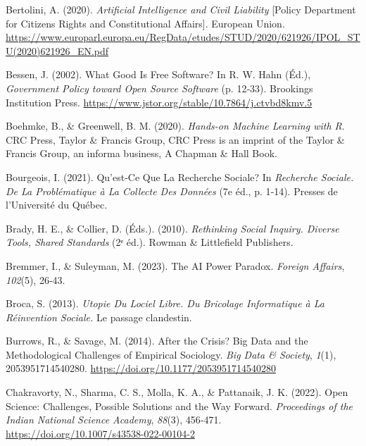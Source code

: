 \documentclass[
  letterpaper,
  DIV=11,
  numbers=noendperiod,
  oneside]{scrreprt}
\newlength{\cslhangindent}
\newlength{\cslentryspacingunit} %
\newenvironment{CSLReferences}[2] %
 {%
  \setlength{\parindent}{0pt}
  \ifodd #1
  \let\oldpar\par
  \def\par{\hangindent=\cslhangindent\oldpar}
  \fi
  \setlength{\parskip}{#2\cslentryspacingunit}
 }%
 {}
\begin{document}
\begin{CSLReferences}{1}{0}
\leavevmode{}%
Bertolini, A. (2020). \emph{Artificial {Intelligence} and {Civil
Liability}} {[}Policy Department for Citizen\textquotesingle s Rights
and Constitutional Affairs{]}. European Union.
\url{https://www.europarl.europa.eu/RegData/etudes/STUD/2020/621926/IPOL_STU(2020)621926_EN.pdf}

\leavevmode{}%
Bessen, J. (2002). What {Good Is Free Software}? In R. W. Hahn (Éd.),
\emph{Government {Policy} toward {Open Source Software}} (p. 12‑33).
Brookings Institution Press.
\url{https://www.jstor.org/stable/10.7864/j.ctvbd8kmv.5}

\leavevmode{}%
Boehmke, B., \& Greenwell, B. M. (2020). \emph{Hands-on Machine Learning
with {R}}. CRC Press, Taylor \& Francis Group, CRC Press is an imprint
of the Taylor \& Francis Group, an informa business, A Chapman \& Hall
Book.

\leavevmode{}%
Bourgeois, I. (2021). Qu'est-Ce Que La Recherche Sociale? In
\emph{Recherche Sociale. {De} La Problématique à La Collecte Des
Données} (7e éd., p. 1‑14). Presses de l'Université du Québec.

\leavevmode{}%
Brady, H. E., \& Collier, D. (Éds.). (2010). \emph{Rethinking {Social
Inquiry}. {Diverse Tools}, {Shared Standards}} (2ᵉ éd.). Rowman \&
Littlefield Publishers.

\leavevmode{}%
Bremmer, I., \& Suleyman, M. (2023). The {AI Power Paradox}.
\emph{Foreign Affairs}, \emph{102}(5), 26‑43.

\leavevmode{}%
Broca, S. (2013). \emph{Utopie Du Lociel Libre. {Du} Bricolage
Informatique à La Réinvention Sociale.} Le passage clandestin.

\leavevmode{}%
Burrows, R., \& Savage, M. (2014). After the Crisis? {Big Data} and the
Methodological Challenges of Empirical Sociology. \emph{Big Data \&
Society}, \emph{1}(1), 2053951714540280.
\url{https://doi.org/10.1177/2053951714540280}

\leavevmode{}%
Chakravorty, N., Sharma, C. S., Molla, K. A., \& Pattanaik, J. K.
(2022). Open {Science}: {Challenges}, {Possible Solutions} and the {Way
Forward}. \emph{Proceedings of the Indian National Science Academy},
\emph{88}(3), 456‑471. \url{https://doi.org/10.1007/s43538-022-00104-2}


\end{CSLReferences}
\end{document}
